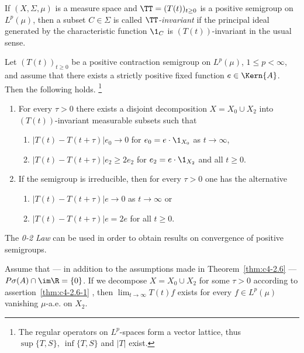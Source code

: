 If\/ $(X, \Sigma, \mu)$ is a measure space and $\TT = (T(t))_{t \geq 0}$ is a positive semigroup on $L^{p}(\mu)$, then a subset $C \in \Sigma$ is called \emph{$\TT$-invariant} if the principal ideal generated by the characteristic function $\1_{C}$ is $(T(t))$-invariant in the usual sense.
\begin{theorem}\label{thm:c4-2.6}
%
%
Let $(T(t))_{t \geq 0}$ be a positive contraction semigroup on $L^{p}(\mu)$, $1 \leq p < \infty$, and assume that there exists a strictly positive fixed function $e \in \Kern{A}$. 
Then the following holds. 
\footnote{The regular operators on $L^p$-spaces form a vector lattice, thus $\sup\{T,S\},\ \inf\{T,S\}$ and $|T|$ exist.}
\begin{enumerate}[\upshape (i)]
\item \label{thm:c4-2.6-1}
For every $\tau > 0$ there exists a disjoint decomposition $X = X_{0} \cup X_{2}$ into $(T(t))$-invariant measurable subsets such that
\begin{enumerate}
    \item[(0)] \label{thm:c4-2.6-1.1} 
    $|T(t) - T(t+\tau)|e_{0} \to 0$ for $e_{0} = e \cdot \1_{X_{0}}$ as $t \to \infty$,
    \item[(2)] \label{thm:c4-2.6-1.2} 
    $|T(t) - T(t+\tau)|e_{2} \geq 2e_{2}$ for $e_{2} = e \cdot \1_{X_{2}}$ and all $t \geq 0$.
    \end{enumerate}

\item \label{thm:c4-2.6-2} 
If the semigroup is irreducible, then for every $\tau > 0$ one has the alternative
\begin{enumerate}
    \item[(0)] \label{thm:c4-2.6-2.1} 
    $|T(t) - T(t+\tau)|e \to 0$ as $t \to \infty$ or
    \item[(2)] \label{thm:c4-2.6-2.2} 
    $|T(t) - T(t+\tau)|e = 2e$ for all $t \geq 0$.
\end{enumerate}
\end{enumerate}
\end{theorem}
The \emph{0-2 Law} can be used in order to obtain results on convergence of positive semigroups.
\begin{corollary}\label{cor:c4-2.7}
%
Assume that --- in addition to the assumptions made in Theorem~\ref{thm:c4-2.6} --- $P{\sigma}(A) \cap \im\R = \{0\}$.
If we decompose $X = X_{0} \cup X_{2}$ for some $\tau > 0$ according to assertion~\ref{thm:c4-2.6-1} , then $\lim_{t \to \infty} T(t)f$ exists for every $f \in L^{p}(\mu)$ vanishing $\mu$-a.e. on $X_{2}$.
\end{corollary}
